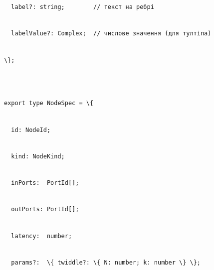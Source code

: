 \documentclass[
]{article}
\newcommand{\passthrough}[1]{#1}
\begin{document}
\passthrough{\lstinline!  !}\passthrough{\lstinline!label?:!}\passthrough{\lstinline! !}\passthrough{\lstinline!string;!}\passthrough{\lstinline!        !}\passthrough{\lstinline!//!}\passthrough{\lstinline! !}\passthrough{\lstinline!текст!}\passthrough{\lstinline! !}\passthrough{\lstinline!на!}\passthrough{\lstinline! !}\passthrough{\lstinline!ребрі!}\strut \\
\passthrough{\lstinline!  !}\passthrough{\lstinline!labelValue!}\passthrough{\lstinline!?:!}\passthrough{\lstinline! !}\passthrough{\lstinline!Complex;!}\passthrough{\lstinline!  !}\passthrough{\lstinline!//!}\passthrough{\lstinline! !}\passthrough{\lstinline!числове!}\passthrough{\lstinline! !}\passthrough{\lstinline!значення!}\passthrough{\lstinline! !}\passthrough{\lstinline!(для!}\passthrough{\lstinline! !}\passthrough{\lstinline!тултіпа!}\passthrough{\lstinline!)!}\strut \\
\passthrough{\lstinline!\};!}\strut \\
\strut \\
\passthrough{\lstinline!export!}\passthrough{\lstinline! !}\passthrough{\lstinline!type!}\passthrough{\lstinline! !}\passthrough{\lstinline!NodeSpec!}\passthrough{\lstinline! !}\passthrough{\lstinline!=!}\passthrough{\lstinline! !}\passthrough{\lstinline!\{!}\strut \\
\passthrough{\lstinline!  !}\passthrough{\lstinline!id:!}\passthrough{\lstinline! !}\passthrough{\lstinline!NodeId!}\passthrough{\lstinline!;!}\strut \\
\passthrough{\lstinline!  !}\passthrough{\lstinline!kind:!}\passthrough{\lstinline! !}\passthrough{\lstinline!NodeKind!}\passthrough{\lstinline!;!}\strut \\
\passthrough{\lstinline!  !}\passthrough{\lstinline!inPorts!}\passthrough{\lstinline!:!}\passthrough{\lstinline!  !}\passthrough{\lstinline!PortId!}\passthrough{\lstinline![];!}\strut \\
\passthrough{\lstinline!  !}\passthrough{\lstinline!outPorts!}\passthrough{\lstinline!:!}\passthrough{\lstinline! !}\passthrough{\lstinline!PortId!}\passthrough{\lstinline![];!}\strut \\
\passthrough{\lstinline!  !}\passthrough{\lstinline!latency:!}\passthrough{\lstinline!  !}\passthrough{\lstinline!number;!}\strut \\
\passthrough{\lstinline!  !}\passthrough{\lstinline!params?:!}\passthrough{\lstinline!  !}\passthrough{\lstinline!\{!}\passthrough{\lstinline! !}\passthrough{\lstinline!twiddle?:!}\passthrough{\lstinline! !}\passthrough{\lstinline!\{!}\passthrough{\lstinline! !}\passthrough{\lstinline!N:!}\passthrough{\lstinline! !}\passthrough{\lstinline!number;!}\passthrough{\lstinline! !}\passthrough{\lstinline!k:!}\passthrough{\lstinline! !}\passthrough{\lstinline!number!}\passthrough{\lstinline! !}\passthrough{\lstinline!\}!}\passthrough{\lstinline! !}\passthrough{\lstinline!\};!}\strut \\
\end{document}
